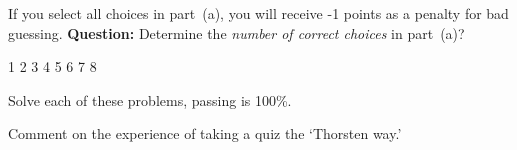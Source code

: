 \documentclass{article}
\begin{document}
\begin{qzbody1}
\begin{quiz*}{\currQuiz}
\begin{questions}
\begin{rtVW}
\begin{questions}
\rowsep{3pt}

      \item{} If you select all choices in part~(a), you will
          receive -1 points as a penalty for bad guessing. \textbf{Question:}
          Determine the \emph{number of correct choices} in part~(a)?
          \begin{answers}{4}
          \bChoices[random=true]
             1\eAns
             2\eAns
             3\eAns
             4\eAns
             5\eAns
             6\eAns
             7\eAns
             8\eAns
          \eChoices
          \end{answers}
    \end{questions}
\end{rtVW}

\eRTVToks

\displayListRandomly{\thisQuiz}

\end{questions}
\writeProListAux
\end{quiz*}\quad\thQuizTrailer

\end{qzbody1}

\begin{qzbody2}

\thQuizHeader

\begin{quiz*}{\currQuiz}
Solve each of these problems, passing is 100\%.
\begin{questions}

\item{} Comment on the experience of taking a quiz the `Thorsten way.'\par
\RespBoxEssay{\linewidth}{1in}

\end{questions}
\writeProListAux
\end{quiz*}\quad\thQuizTrailer

\end{qzbody2}

%
%


\end{document}
